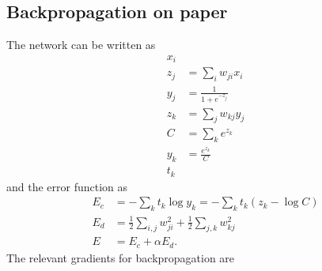 \documentclass[a4paper,11pt]{article}
\begin{document}
	\subsection{Backpropagation on paper}
  The network can be written as
  \begin{align*}
    \tag{input layer}
      x_i\\
    \tag{hidden layer weighting}
      z_j&=\sum_iw_{ji}x_i\\
    \tag{hidden layer activation}
      y_j&=\frac{1}{1+e^{-z_j}}\\
    \tag{output layer weighting}
      z_k&=\sum_jw_{kj}y_j\\
    \tag{output layer normalization}
      C&=\sum_ke^{z_k}\\
    \tag{output layer activation}
      y_k&=\frac{e^{z_k}}{C}\\
    \tag{output target}
      t_k
  \end{align*}
  and the error function as
  \begin{align*}
    \tag{classification error}
      E_c &= -\sum_kt_k\log y_k=-\sum_kt_k(z_k-\log C) \\
    \tag{weight decay error}
      E_d &= \frac{1}{2}\sum_{i,j}w_{ji}^2 + \frac{1}{2}\sum_{j,k}w_{kj}^2\\
    \tag{total error}
      E &= E_c + \alpha E_d.
  \end{align*}
  The relevant gradients for backpropagation are
\end{document}
